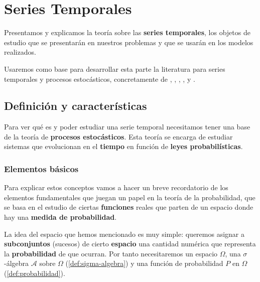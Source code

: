 %

\chapter{Series Temporales}\label{ch:st}

Presentamos y explicamos la teoría sobre las \textbf{series temporales}, los objetos de estudio que se presentarán en nuestros problemas y que se usarán en los modelos realizados.

Usaremos como base para desarrollar esta parte la literatura para series temporales y procesos estocásticos, concretamente de \cite{cox1977theory}, \cite{chatfield2019analysis}, \cite{brockwell2002introduction}, \cite{hyndman2018forecasting}, \cite{box2011time} y \cite{grandell1998time}.

\section{Definición y características}

Para ver qué es y poder estudiar una serie temporal necesitamos tener una base de la teoría de \textbf{procesos estocásticos}. Esta teoría se encarga de estudiar sistemas que evolucionan en el \textbf{tiempo} en función de \textbf{leyes probabilísticas}.

\subsection{Elementos básicos}

Para explicar estos conceptos vamos a hacer un breve recordatorio de los elementos fundamentales que juegan un papel en la teoría de la probabilidad, que se basa en el estudio de ciertas \textbf{funciones} reales que parten de un espacio donde hay una \textbf{medida de probabilidad}.

La idea del espacio que hemos mencionado es muy simple: queremos asignar a \textbf{subconjuntos} (sucesos) de cierto \textbf{espacio} una cantidad numérica que representa la \textbf{probabilidad} de que ocurran. Por tanto necesitaremos un espacio $\Omega$, una $\sigma$-álgebra $\mathcal{A}$ sobre $\Omega$ (\autoref{def:sigma-algebra}) y una función de probabilidad $P$ en $\Omega$ (\autoref{def:probabilidad}).

